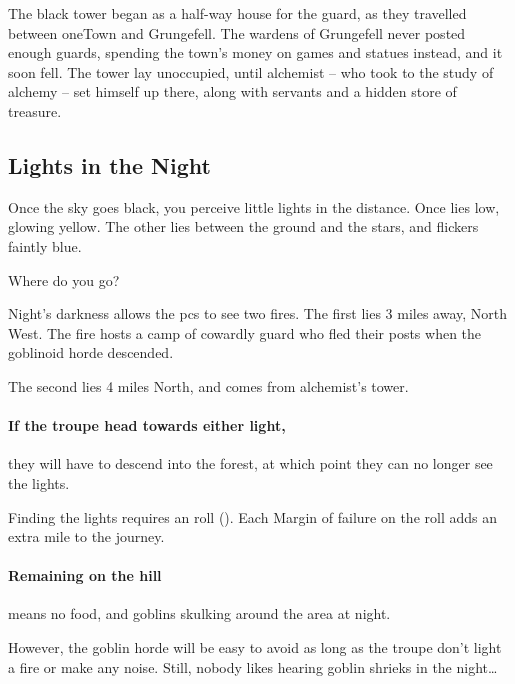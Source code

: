 \begin{multicols}{2}

\begin{exampletext}
  The black tower began as a half-way house for the \gls{guard}, as they travelled between \gls{oneTown} and Grungefell.
  The wardens of Grungefell never posted enough guards, spending the town's money on games and statues instead, and it soon fell.
  The tower lay unoccupied, until \gls{alchemist} --  who took to the study of alchemy -- set himself up there, along with servants and a hidden store of treasure.
\end{exampletext}

\subsection{Lights in the Night}

\begin{boxtext}
  Once the sky goes black, you perceive little lights in the distance.
  Once lies low, glowing yellow.
  The other lies between the ground and the stars, and flickers faintly blue.

  Where do you go?
\end{boxtext}

Night's darkness allows the \glspl{pc} to see two fires.
The first lies 3 miles away, North West.
The fire hosts a camp of cowardly \gls{guard} who fled their posts when the goblinoid horde descended.

The second lies 4 miles North, and comes from \gls{alchemist}'s tower.

\paragraph{If the troupe head towards either light,}
they will have to descend into the forest, at which point they can no longer see the lights.

Finding the lights requires an  roll (\tn[9]).
Each Margin of failure on the roll adds an extra mile to the journey.%

\paragraph{Remaining on the hill}
means no food, and goblins skulking around the area at night.

However, the goblin horde will be easy to avoid as long as the troupe don't light a fire or make any noise.
Still, nobody likes hearing goblin shrieks in the night\ldots


\end{multicols}
